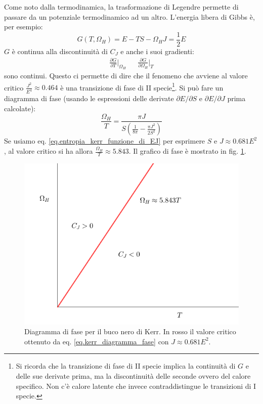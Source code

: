 Come noto dalla termodinamica, la trasformazione di Legendre permette di passare da un potenziale termodinamico ad un altro. L'energia libera di Gibbs è, per esempio:
\begin{equation}
    G(T, \Omega_H) = E - TS - \Omega_H J = \frac{1}{2}E
    \label{eq.en_libera_gibbs_ker}
\end{equation}
$G$ è continua alla discontinuità di $C_J$ e anche i suoi gradienti:
\begin{align*}
    \frac{\partial G}{\partial T}\Big|_{\Omega_H} && \frac{\partial G}{\partial \Omega_H}\Big|_T
\end{align*}
sono continui. Questo ci permette di dire che il fenomeno che avviene al valore critico $\frac{J^2}{E^4}\approx 0.464$ è una transizione di fase di II specie\footnote{Si ricorda che la transizione di fase di II specie implica la continuità di $G$ e delle sue derivate prima, ma la discontinuità delle seconde ovvero del calore specifico. Non c'è calore latente che invece contraddistingue le transizioni di I specie.}.
Si può fare un diagramma di fase (usando le espressioni delle derivate $\partial E/\partial S$ e $\partial E/\partial J$ prima calcolate):
\begin{equation}
    \frac{\Omega_H}{T} = \frac{\pi J}{S( \frac{1}{8\pi} - \frac{\pi J^2}{2S^2})}
    \label{eq.kerr_diagramma_fase}
\end{equation}
Se usiamo eq. \ref{eq.entropia_kerr_funzione_di_EJ} per esprimere $S$ e $J\approx 0.681E^2$, al valore critico si ha allora $\frac{\Omega_H}{T}\approx 5.843$. Il grafico di fase è mostrato in fig. \ref{fig.kerr_diagramma_fase}.
\begin{figure}
    \centering
    \includegraphics[scale=0.5]{immagini/kerr_diagramma_fase.png}
    \caption{Diagramma di fase per il buco nero di Kerr. In rosso il valore critico ottenuto da eq. \ref{eq.kerr_diagramma_fase} con $J\approx 0.681 E^2$.}
    \label{fig.kerr_diagramma_fase}
\end{figure}
